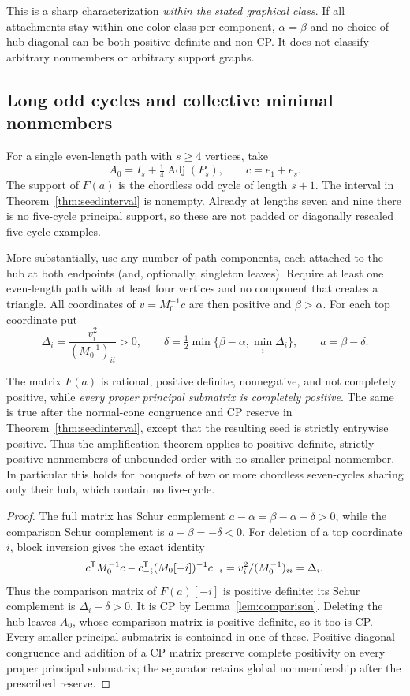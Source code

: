 This is a sharp characterization \emph{within the stated graphical class}. If all attachments stay within one color class per component, $\alpha=\beta$ and no choice of hub diagonal can be both positive definite and non-CP. It does not classify arbitrary nonmembers or arbitrary support graphs.

\subsection{Long odd cycles and collective minimal nonmembers}
For a single even-length path with $s\ge4$ vertices, take
\[
 A_0=I_s+\tfrac14\operatorname{Adj}(P_s),\qquad c=e_1+e_s.
\]
The support of $F(a)$ is the chordless odd cycle of length $s+1$. The interval in Theorem~\ref{thm:seedinterval} is nonempty. Already at lengths seven and nine there is no five-cycle principal support, so these are not padded or diagonally rescaled five-cycle examples.

More substantially, use any number of path components, each attached to the hub at both endpoints (and, optionally, singleton leaves). Require at least one even-length path with at least four vertices and no component that creates a triangle. All coordinates of $v=M_0^{-1}c$ are then positive and $\beta>\alpha$. For each top coordinate put
\[
 \Delta_i=\frac{v_i^2}{(M_0^{-1})_{ii}}>0,\qquad
 \delta=\tfrac12\min\{\beta-\alpha,\min_i\Delta_i\},\qquad a=\beta-\delta.
\]

\begin{theorem}\label{thm:minimal}
The matrix $F(a)$ is rational, positive definite, nonnegative, and not completely positive, while \emph{every proper principal submatrix is completely positive}. The same is true after the normal-cone congruence and CP reserve in Theorem~\ref{thm:seedinterval}, except that the resulting seed is strictly entrywise positive. Thus the amplification theorem applies to positive definite, strictly positive nonmembers of unbounded order with no smaller principal nonmember. In particular this holds for bouquets of two or more chordless seven-cycles sharing only their hub, which contain no five-cycle.
\end{theorem}
\begin{proof}
The full matrix has Schur complement $a-\alpha=\beta-\alpha-\delta>0$, while the comparison Schur complement is $a-\beta=-\delta<0$. For deletion of a top coordinate $i$, block inversion gives the exact identity
\[
 c^{\mathsf T} M_0^{-1}c-c_{-i}^{\mathsf T}(M_0[-i])^{-1}c_{-i}
 =v_i^2/(M_0^{-1})_{ii}=\Delta_i.
\]
Thus the comparison matrix of $F(a)[-i]$ is positive definite: its Schur complement is $\Delta_i-\delta>0$. It is CP by Lemma~\ref{lem:comparison}. Deleting the hub leaves $A_0$, whose comparison matrix is positive definite, so it too is CP. Every smaller principal submatrix is contained in one of these. Positive diagonal congruence and addition of a CP matrix preserve complete positivity on every proper principal submatrix; the separator retains global nonmembership after the prescribed reserve.
\end{proof}


